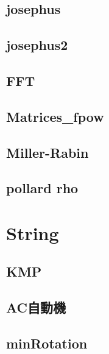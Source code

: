 \documentclass[a4paper,10pt,twocolumn,oneside]{article}
\begin{document}
    \subsection{josephus}
    

    \subsection{josephus2}
    

    \subsection{FFT}
    

    \subsection{Matrices\_fpow}
    

    \subsection{Miller-Rabin}
    

    \subsection{pollard rho}
    



\section{String}
    \subsection{KMP}
    

    \subsection{AC自動機}
    
    
    \subsection{minRotation}
    
\end{document}
